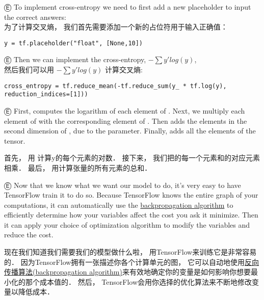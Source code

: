 Ⓔ To implement cross-entropy we need to first add a new placeholder to input the correct answers:\\
为了计算交叉熵， 我们首先需要添加一个新的占位符用于输入正确值：
\\
\begin{lstlisting}
y = tf.placeholder("float", [None,10])
\end{lstlisting}
Ⓔ Then we can implement the cross-entropy, $-\sum{y'log(y)}$,\\
然后我们可以用 $-\sum{y'log(y)}$ 计算交叉熵:

\begin{lstlisting}
cross_entropy = tf.reduce_mean(-tf.reduce_sum(y_ * tf.log(y), reduction_indices=[1]))
\end{lstlisting}

Ⓔ First,  computes the logarithm of each element of . Next, we multiply each element of  with the corresponding element of . Then  adds the elements in the second dimension of , due to the  parameter. Finally,  adds all the elements of the tensor.

首先， 用  计算y的每个元素的对数．  接下来， 我们把的每一个元素和的对应元素相乘．  最后， 用计算张量的所有元素的总和．



Ⓔ Now that we know what we want our model to do, it's very easy to have TensorFlow train it to do so. Because TensorFlow knows the entire graph of your computations, it can automatically use the \href{http://colah.github.io/posts/2015-08-Backprop/}{backpropagation algorithm} to efficiently determine how your variables affect the cost you ask it minimize. Then it can apply your choice of optimization algorithm to modify the variables and reduce the cost.

现在我们知道我们需要我们的模型做什么啦， 用TensorFlow来训练它是非常容易的．  因为TensorFlow拥有一张描述你各个计算单元的图， 它可以自动地使用\href{http://colah.github.io/posts/2015-08-Backprop/}{反向传播算法(backpropagation algorithm)}来有效地确定你的变量是如何影响你想要最小化的那个成本值的．  然后， TensorFlow会用你选择的优化算法来不断地修改变量以降低成本．

